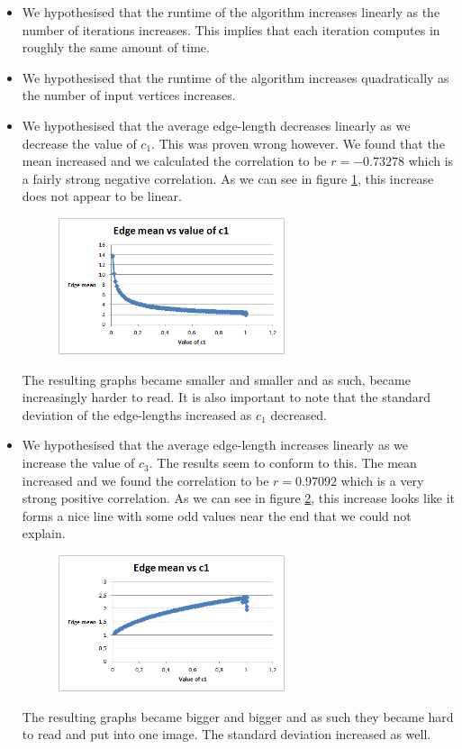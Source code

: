 \documentclass[a4paper,12pt]{article}
\begin{document}
\begin{itemize}
\item We hypothesised that the runtime of the algorithm increases linearly as the number of iterations increases. This implies that each iteration computes in roughly the same amount of time.
\item We hypothesised that the runtime of the algorithm increases quadratically as the number of input vertices increases.
\item We hypothesised that the average edge-length decreases linearly as we decrease the value of $c_1$. This was proven wrong however. We found that the mean increased and we calculated the correlation to be $r=-0.73278$ which is a fairly strong negative correlation. As we can see in figure \ref{fig:graphc1}, this increase does not appear to be linear.
\begin{figure}[h]
	\centering
	\includegraphics[height=4cm]{Edgemeanvsc1}
	\label{fig:graphc1}
\end{figure}
The resulting graphs became smaller and smaller and as such, became increasingly harder to read. It is also important to note that the standard deviation of the edge-lengths increased as $c_1$ decreased.
\item We hypothesised that the average edge-length increases linearly as we increase the value of $c_3$. The results seem to conform to this. The mean increased and we found the correlation to be $r=0.97092$ which is a very strong positive correlation. As we can see in figure \ref{fig:graphc3}, this increase looks like it forms a nice line with some odd values near the end that we could not explain.
\begin{figure}[h]
	\centering
	\includegraphics[height=4cm]{Edgemeanvsc3}
	\label{fig:graphc3}
\end{figure}
The resulting graphs became bigger and bigger and as such they became hard to read and put into one image. The standard deviation increased as well.
\end{itemize}
\end{document}
